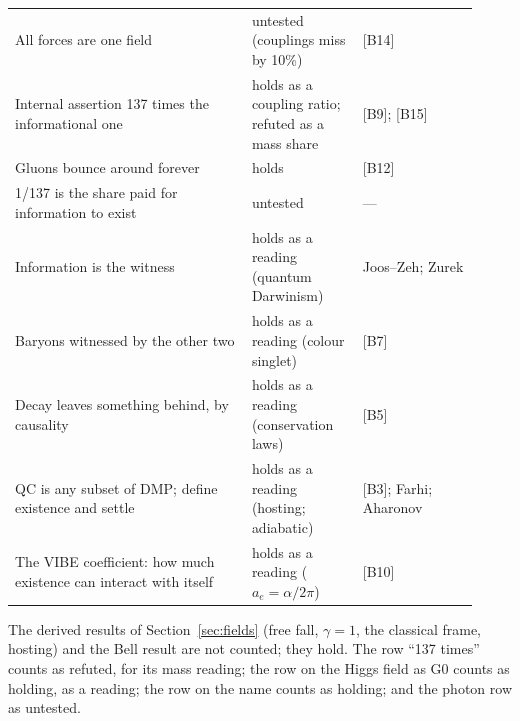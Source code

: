 \documentclass[11pt,a4paper]{article}
\theoremstyle{definition}
\newcommand{\chk}[1]{\textsf{[#1]}}
\begin{document}
\begin{center}
\begin{longtable}{@{}p{0.47\linewidth}p{0.22\linewidth}p{0.23\linewidth}@{}}
All forces are one field & untested (couplings miss by 10\%) & \chk{B14} \\
Internal assertion 137 times the informational one & holds as a coupling ratio; refuted as a mass share & \chk{B9}; \chk{B15} \\
Gluons bounce around forever & holds & \chk{B12} \\
1/137 is the share paid for information to exist & untested & --- \\
Information is the witness & holds as a reading (quantum Darwinism) & Joos--Zeh; Zurek \\
Baryons witnessed by the other two & holds as a reading (colour singlet) & \chk{B7} \\
Decay leaves something behind, by causality & holds as a reading (conservation laws) & \chk{B5} \\
QC is any subset of DMP; define existence and settle & holds as a reading (hosting; adiabatic) & \chk{B3}; Farhi; Aharonov \\
The VIBE coefficient: how much existence can interact with itself & holds as a reading ($a_e=\alpha/2\pi$) & \chk{B10} \\
\bottomrule
\end{longtable}
\end{center}

\noindent The derived results of Section~\ref{sec:fields} (free fall, $\gamma=1$, the classical frame, hosting) and the Bell result are not
counted; they hold. The row ``137 times'' counts as refuted, for its mass reading; the row on the Higgs field as G0 counts as holding,
as a reading; the row on the name counts as holding; and the photon row as untested.
\end{document}
